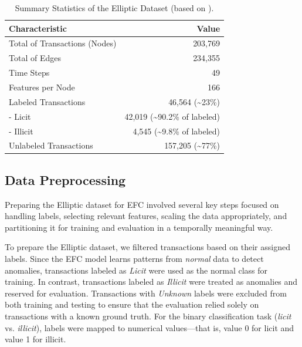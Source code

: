 \documentclass[12pt]{article}
\begin{document}
\begin{table}[htbp]
  \centering
  \caption{Summary Statistics of the Elliptic Dataset (based on \cite{weber2019antimoneylaunderingbitcoinexperimenting}).}
  \label{tab:dataset_summary}
  \begin{small}
  \begin{tabular}{lr}\toprule
    Characteristic        & Value \\ \midrule
    Total of Transactions (Nodes) & 203,769 \\
    Total of Edges           & 234,355 \\
    Time Steps            & 49 \\
    Features per Node     & 166 \\
    Labeled Transactions  & 46,564 (\textasciitilde23\%) \\
    \quad - Licit         & 42,019 (\textasciitilde90.2\% of labeled) \\
    \quad - Illicit       & 4,545 (\textasciitilde9.8\% of labeled) \\
    Unlabeled Transactions & 157,205 (\textasciitilde77\%) \\ \bottomrule
  \end{tabular}
  \end{small}
\end{table}

\subsection{Data Preprocessing} \label{subsec:preprocessing}
Preparing the Elliptic dataset for EFC involved several key steps focused on handling labels, selecting relevant features,
scaling the data appropriately, and partitioning it for training and evaluation in a temporally meaningful way.

To prepare the Elliptic dataset, we filtered transactions based on their assigned labels. Since the
EFC model learns patterns from \textit{normal} data to detect anomalies, transactions labeled as \textit{Licit} were used
as the normal class for training. In contrast, transactions labeled as \textit{Illicit} were treated as anomalies and reserved
for evaluation. Transactions with \textit{Unknown} labels were excluded from both training and testing to ensure that the
evaluation relied solely on transactions with a known ground truth. For the binary classification task (\textit{licit} vs.
\textit{illicit}), labels were mapped to numerical values---that is, value 0 for licit and value 1 for illicit.
\end{document}
